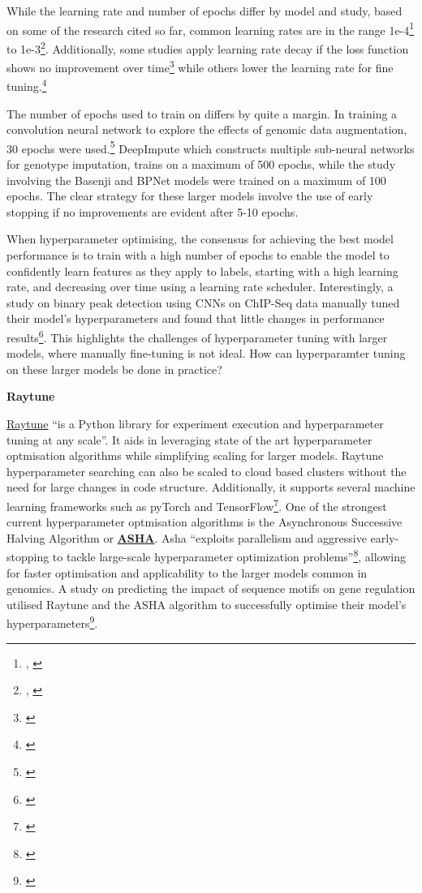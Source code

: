 \documentclass[
]{book}
\begin{document}
While the learning rate and number of epochs differ by model and study, based on some of the research cited so far, common learning rates are in the range 1e-4\footnote{\citep{cedric2019}, \citep{avsec2021}} to 1e-3\footnote{\citep{cao2019}, \citep{toneyan2022}}. Additionally, some studies apply learning rate decay if the loss function shows no improvement over time\footnote{\citet{toneyan2022}} while others lower the learning rate for fine tuning.\footnote{\citet{avsec2021}}

The number of epochs used to train on differs by quite a margin. In training a convolution neural network to explore the effects of genomic data augmentation, 30 epochs were used.\footnote{\citet{cao2019}} DeepImpute which constructs multiple sub-neural networks for genotype imputation, trains on a maximum of 500 epochs, while the study involving the Basenji and BPNet models were trained on a maximum of 100 epochs. The clear strategy for these larger models involve the use of early stopping if no improvements are evident after 5-10 epochs.

When hyperparameter optimising, the consensus for achieving the best model performance is to train with a high number of epochs to enable the model to confidently learn features as they apply to labels, starting with a high learning rate, and decreasing over time using a learning rate scheduler. Interestingly, a study on binary peak detection using CNNs on ChIP-Seq data manually tuned their model's hyperparameters and found that little changes in performance results\footnote{\citet{oh2020}}. This highlights the challenges of hyperparameter tuning with larger models, where manually fine-tuning is not ideal. How can hyperparamter tuning on these larger models be done in practice?

\textbf{Raytune}

\href{https://docs.ray.io/en/latest/tune/index.html}{Raytune} ``is a Python library for experiment execution and hyperparameter tuning at any scale''. It aids in leveraging state of the art hyperparameter optmisation algorithms while simplifying scaling for larger models. Raytune hyperparameter searching can also be scaled to cloud based clusters without the need for large changes in code structure. Additionally, it supports several machine learning frameworks such as pyTorch and TensorFlow\footnote{\citet{liaw2018}}. One of the strongest current hyperparameter optmisation algorithms is the Asynchronous Successive Halving Algorithm or \textbf{\href{https://blog.ml.cmu.edu/2018/12/12/massively-parallel-hyperparameter-optimization/}{ASHA}}. Asha ``exploits parallelism and aggressive early-stopping to tackle large-scale hyperparameter optimization problems''\footnote{\citet{liam2018}}, allowing for faster optimisation and applicability to the larger models common in genomics. A study on predicting the impact of sequence motifs on gene regulation utilised Raytune and the ASHA algorithm to successfully optimise their model's hyperparameters\footnote{\citet{jacob2023}}.
\end{document}
